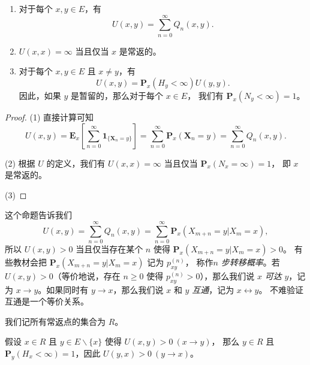 \documentclass[fontset=none]{Notes}
\newcommand{\mat}[1]{\mathbold{#1}}
\newcommand{\matup}[1]{\mathbf{#1}}
\newcommand{\indicator}[1]{\mathbold 1_{#1}}
\begin{document}
\begin{proposition}
  \mbox{}
  \begin{enumerate}
    \item 对于每个 $x,y\in E$，有
    \[
      U(x,y)=\sum_{n=0}^\infty Q_n(x,y).  
    \]
    \item $U(x,x)=\infty$ 当且仅当 $x$ 是常返的。
    \item 对于每个 $x,y\in E$ 且 $x\neq y$，有
    \[
      U(x,y)=\matup P_x(H_y<\infty) U(y,y).  
    \]
    因此，如果 $y$ 是暂留的，那么对于每个 $x\in E$，
    我们有 $\matup P_x(N_y<\infty)=1$。
  \end{enumerate}
\end{proposition}
\begin{proof}
  (1) 直接计算可知
  \[
    U(x,y)=\matup E_x\left[
      \sum_{n=0}^\infty \indicator{\{\mat X_n=y\}}
    \right]  =\sum_{n=0}^\infty \matup P_x(\mat X_n=y)
    =\sum_{n=0}^\infty Q_n(x,y).
  \]

  (2) 根据 $U$ 的定义，我们有
  $U(x,x)=\infty$ 当且仅当 $\matup P_x(N_x=\infty)=1$，
  即 $x$ 是常返的。

  (3) 
\end{proof}

\begin{remark}
  这个命题告诉我们
  \[
    U(x,y)=\sum_{n=0}^\infty Q_n(x,y)=\sum_{n=0}^\infty
    \matup P_x(X_{m+n}=y|X_m=x),
  \]
  所以 $U(x,y)>0$ 当且仅当存在某个 $n$ 使得 $\matup P_x(X_{m+n}=y|X_m=x)>0$。
  有些教材会把 $\matup P_x(X_{m+n}=y|X_m=x)$ 记为 $p_{xy}^{(n)}$，
  称作\emph{$n$ 步转移概率}。若 $U(x,y)>0$（等价地说，存在
  $n\geq 0$ 使得 $p_{xy}^{(n)}>0$），那么我们说 $x$ \emph{可达}
  $y$，记为 $x\to y$。如果同时有 $y\to x$，那么我们说 
  $x$ 和 $y$ \emph{互通}，记为 $x\leftrightarrow y$。
  不难验证互通是一个等价关系。
\end{remark}

我们记所有常返点的集合为 $R$。

\begin{lemma}
  假设 $x\in R$ 且 $y\in E \smallsetminus\{x\}$ 使得 $U(x,y)>0 \ (x\to y)$，
  那么 $y\in R$ 且 $\matup P_y(H_x<\infty)=1$，因此 $U(y,x)>0\ (y\to x)$。
\end{lemma}


\end{document}

